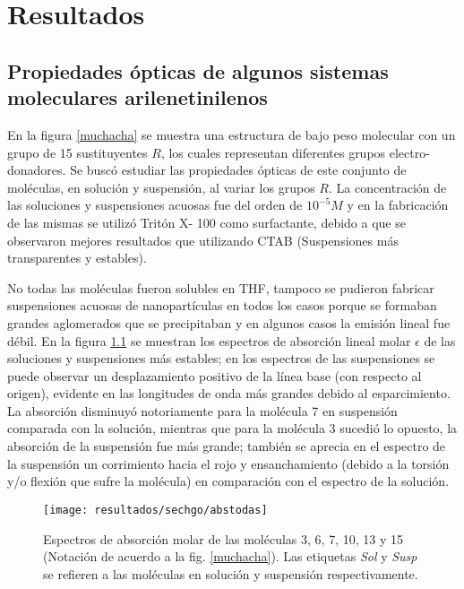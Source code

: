 \chapter{Resultados}   
\minitoc

\section{Propiedades \'opticas de algunos sistemas moleculares arilenetinilenos}

En la figura \ref{muchacha} se muestra una estructura de bajo peso molecular con un grupo de 15 sustituyentes $R$, los cuales representan diferentes grupos electro-donadores. Se busc\'o estudiar las propiedades \'opticas de este conjunto de mol\'eculas, en soluci\'on y suspensi\'on, al variar los grupos $R$. La concentraci\'on de las soluciones y suspensiones acuosas fue del orden de $10^{-5} M$ y en la fabricaci\'on de las mismas se utiliz\'o Trit\'on X- 100 como surfactante, debido a que se observaron mejores resultados que utilizando CTAB (Suspensiones m\'as transparentes y estables).

No todas las mol\'eculas fueron solubles en THF, tampoco se pudieron fabricar suspensiones acuosas de nanopart\'iculas en todos los casos porque se formaban grandes aglomerados que se precipitaban y en algunos casos la emisi\'on lineal fue d\'ebil. En la figura \ref{abshgo} se muestran los espectros de absorci\'on lineal molar $\epsilon$ de las soluciones y suspensiones m\'as estables; en los espectros de las suspensiones se puede observar un desplazamiento positivo de la l\'inea base (con respecto al origen), evidente en las longitudes de onda m\'as grandes debido al esparcimiento. La absorci\'on disminuy\'o notoriamente para la mol\'ecula 7 en suspensi\'on comparada con la soluci\'on, mientras que para la mol\'ecula 3 sucedi\'o lo opuesto, la absorci\'on de la suspensi\'on fue m\'as grande; tambi\'en se aprecia en el espectro de la suspensi\'on un corrimiento hacia el rojo y ensanchamiento (debido a la torsi\'on y/o flexi\'on que sufre la mol\'ecula) en comparaci\'on con el espectro de la soluci\'on.

\begin{figure}[h]
\centering
\texttt{[image: resultados/sechgo/abstodas]}
\caption{Espectros de absorci\'on molar de las mol\'eculas 3, 6, 7, 10, 13 y 15 (Notaci\'on de acuerdo a la fig. \ref{muchacha}). Las etiquetas \emph{Sol} y \emph{Susp} se refieren a las mol\'eculas en soluci\'on y suspensi\'on respectivamente.}\label{abshgo}
\end{figure}


